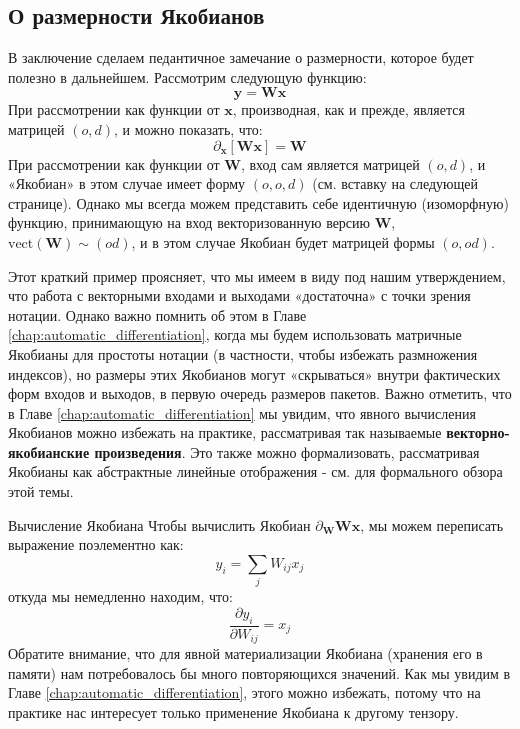 \subsection*{О размерности Якобианов \addteacup}
%
В заключение сделаем педантичное замечание о размерности, которое будет полезно в дальнейшем.   Рассмотрим следующую функцию:
%
$$
\mathbf{y} = \mathbf{W}\mathbf{x}
$$
%
При рассмотрении как функции от $\mathbf{x}$, производная, как и прежде, является матрицей $(o, d)$, и можно показать, что:
%
$$
\partial_{\mathbf{x}}\left[\mathbf{W}\mathbf{x}\right] =\mathbf{W}
$$
%
При рассмотрении как функции от $\mathbf{W}$, вход сам является матрицей $(o, d)$, и «Якобиан» в этом случае имеет форму $(o,o,d)$ (см. вставку на следующей странице). Однако мы всегда можем представить себе идентичную (изоморфную) функцию, принимающую на вход векторизованную версию $\mathbf{W}$, $\text{vect}(\mathbf{W})  \sim(od)$, и в этом случае Якобиан будет матрицей формы $(o, od)$.

Этот краткий пример проясняет, что мы имеем в виду под нашим утверждением, что работа с векторными входами и выходами «достаточна» с точки зрения нотации. Однако важно помнить об этом в Главе \ref{chap:automatic_differentiation}, когда мы будем использовать матричные Якобианы для простоты нотации (в частности, чтобы избежать размножения индексов), но размеры этих Якобианов могут «скрываться» внутри фактических форм входов и выходов, в первую очередь размеров пакетов. Важно отметить, что в Главе \ref{chap:automatic_differentiation} мы увидим, что явного вычисления Якобианов можно избежать на практике, рассматривая так называемые \textbf{векторно-якобианские произведения}. Это также можно формализовать, рассматривая Якобианы как абстрактные линейные отображения - см. \cite{blondel2024elements} для формального обзора этой темы.

\begin{supportbox}{Вычисление Якобиана}
Чтобы вычислить Якобиан $\partial_{\mathbf{W}} \mathbf{W}\mathbf{x}$, мы можем переписать выражение поэлементно как:
%
$$
y_i=\sum_j W_{ij}x_j
$$
%
откуда мы немедленно находим, что:
%
\begin{equation}
\frac{\partial y_i}{\partial W_{ij}}=x_j
\label{eq:partial_yi_wij}
\end{equation}
%
Обратите внимание, что для явной материализации Якобиана (хранения его в памяти) нам потребовалось бы много повторяющихся значений. Как мы увидим в Главе \ref{chap:automatic_differentiation}, этого можно избежать, потому что на практике нас интересует только применение Якобиана к другому тензору.
\label{supportbox:jacobian}
\end{supportbox}

